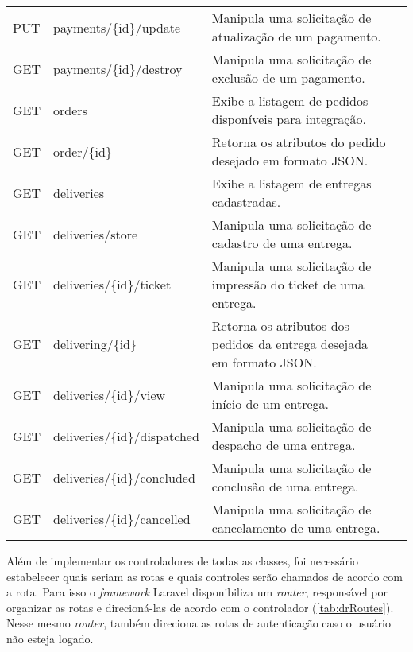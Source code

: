 \begin{table}[H]
\begin{tabular}{llp{9.2cm}l}
PUT & payments/\{id\}/update & Manipula uma solicitação de atualização de um pagamento. \\
GET & payments/\{id\}/destroy & Manipula uma solicitação de exclusão de um pagamento. \\
GET & orders & Exibe a listagem de pedidos disponíveis para integração. \\
GET & order/\{id\} & Retorna os atributos do pedido desejado em formato JSON. \\
GET & deliveries & Exibe a listagem de entregas cadastradas. \\
GET & deliveries/store & Manipula uma solicitação de cadastro de uma entrega. \\
GET & deliveries/\{id\}/ticket & Manipula uma solicitação de impressão do ticket de uma entrega. \\
GET & delivering/\{id\} & Retorna os atributos dos pedidos da entrega desejada em formato JSON. \\
GET & deliveries/\{id\}/view & Manipula uma solicitação de início de um entrega. \\
GET & deliveries/\{id\}/dispatched & Manipula uma solicitação de despacho de uma entrega. \\
GET & deliveries/\{id\}/concluded & Manipula uma solicitação de conclusão de uma entrega. \\
GET & deliveries/\{id\}/cancelled & Manipula uma solicitação de cancelamento de uma entrega. \\
\bottomrule
\end{tabular}
\end{table}

\newpage
Além de implementar os controladores de todas as classes, foi necessário estabelecer quais seriam as rotas e quais controles serão chamados de acordo com a rota. Para isso o \textit{framework} Laravel disponibiliza um \textit{router}, responsável por organizar as rotas e direcioná-las de acordo com o controlador (\autoref{tab:drRoutes}). Nesse mesmo \textit{router}, também direciona as rotas de autenticação caso o usuário não esteja logado.